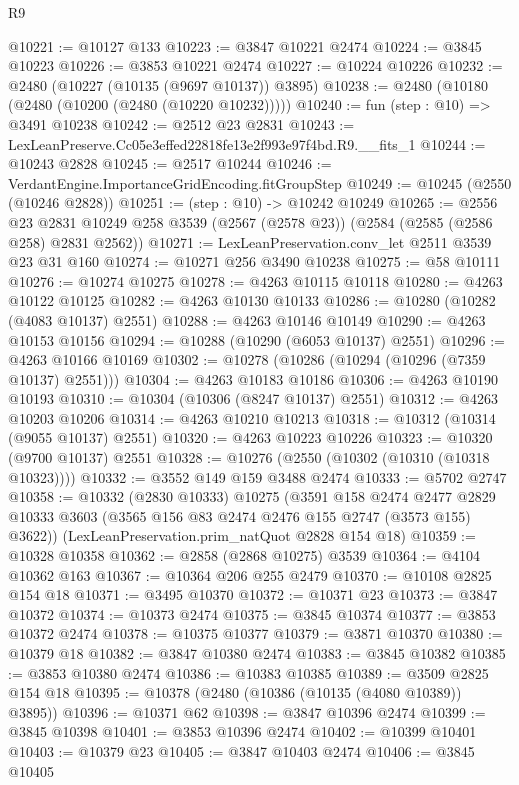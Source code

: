 \begin{lexlean}{R9}
\begin{coremodule}
@10221 := @10127 @133
@10223 := @3847 @10221 @2474
@10224 := @3845 @10223
@10226 := @3853 @10221 @2474
@10227 := @10224 @10226
@10232 := @2480 (@10227 (@10135 (@9697 @10137)) @3895)
@10238 := @2480 (@10180 (@2480 (@10200 (@2480 (@10220 @10232)))))
@10240 := fun (step : @10) => @3491 @10238
@10242 := @2512 @23 @2831
@10243 := LexLeanPreserve.Cc05e3effed22818fe13e2f993e97f4bd.R9.__fits_1
@10244 := @10243 @2828
@10245 := @2517 @10244
@10246 := VerdantEngine.ImportanceGridEncoding.fitGroupStep
@10249 := @10245 (@2550 (@10246 @2828))
@10251 := (step : @10) -> @10242 @10249
@10265 := @2556
    @23
    @2831
    @10249
    @258
    @3539
    (@2567 (@2578 @23))
    (@2584 (@2585 (@2586 @258) @2831 @2562))
@10271 := LexLeanPreservation.conv_let @2511 @3539 @23 @31 @160
@10274 := @10271 @256 @3490 @10238
@10275 := @58 @10111
@10276 := @10274 @10275
@10278 := @4263 @10115 @10118
@10280 := @4263 @10122 @10125
@10282 := @4263 @10130 @10133
@10286 := @10280 (@10282 (@4083 @10137) @2551)
@10288 := @4263 @10146 @10149
@10290 := @4263 @10153 @10156
@10294 := @10288 (@10290 (@6053 @10137) @2551)
@10296 := @4263 @10166 @10169
@10302 := @10278 (@10286 (@10294 (@10296 (@7359 @10137) @2551)))
@10304 := @4263 @10183 @10186
@10306 := @4263 @10190 @10193
@10310 := @10304 (@10306 (@8247 @10137) @2551)
@10312 := @4263 @10203 @10206
@10314 := @4263 @10210 @10213
@10318 := @10312 (@10314 (@9055 @10137) @2551)
@10320 := @4263 @10223 @10226
@10323 := @10320 (@9700 @10137) @2551
@10328 := @10276 (@2550 (@10302 (@10310 (@10318 @10323))))
@10332 := @3552 @149 @159 @3488 @2474
@10333 := @5702 @2747
@10358 := @10332
    (@2830 @10333)
    @10275
    (@3591
      @158
      @2474
      @2477
      @2829
      @10333
      @3603
      (@3565 @156 @83 @2474 @2476 @155 @2747 (@3573 @155) @3622))
    (LexLeanPreservation.prim_natQuot @2828 @154 @18)
@10359 := @10328 @10358
@10362 := @2858 (@2868 @10275) @3539
@10364 := @4104 @10362 @163
@10367 := @10364 @206 @255 @2479
@10370 := @10108 @2825 @154 @18
@10371 := @3495 @10370
@10372 := @10371 @23
@10373 := @3847 @10372
@10374 := @10373 @2474
@10375 := @3845 @10374
@10377 := @3853 @10372 @2474
@10378 := @10375 @10377
@10379 := @3871 @10370
@10380 := @10379 @18
@10382 := @3847 @10380 @2474
@10383 := @3845 @10382
@10385 := @3853 @10380 @2474
@10386 := @10383 @10385
@10389 := @3509 @2825 @154 @18
@10395 := @10378 (@2480 (@10386 (@10135 (@4080 @10389)) @3895))
@10396 := @10371 @62
@10398 := @3847 @10396 @2474
@10399 := @3845 @10398
@10401 := @3853 @10396 @2474
@10402 := @10399 @10401
@10403 := @10379 @23
@10405 := @3847 @10403 @2474
@10406 := @3845 @10405

\end{coremodule}
\end{lexlean}
